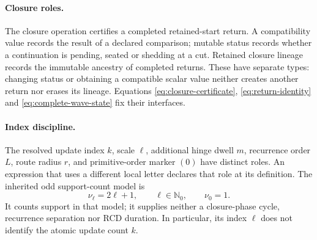 \paragraph{Closure roles.}
\label{app:closure-role-separation}
The closure operation certifies a completed retained-start return. A compatibility
value records the result of a declared comparison; mutable status records whether
a continuation is pending, seated or shedding at a cut. Retained closure lineage
records the immutable ancestry of completed returns. These have separate types:
changing status or obtaining a compatible scalar value neither creates another
return nor erases its lineage. Equations \eqref{eq:closure-certificate},
\eqref{eq:return-identity} and \eqref{eq:complete-wave-state} fix their interfaces.

\paragraph{Index discipline.}
\label{app:index-discipline}
The resolved update index \(k\), scale \(\ell\), additional hinge dwell \(m\),
recurrence order \(L\), route radius \(r\), and primitive-order marker \((0)\)
have distinct roles. An expression that uses a different local letter declares
that role at its definition. The inherited odd support-count model is
\begin{equation}
\nu_\ell=2\ell+1,\qquad \ell\in\mathbb N_0,\qquad \nu_0=1.
\label{eq:odd-support-index}
\end{equation}
It counts support in that model; it supplies neither a closure-phase cycle, recurrence
separation nor RCD duration. In particular, its index \(\ell\) does not identify
the atomic update count \(k\).
